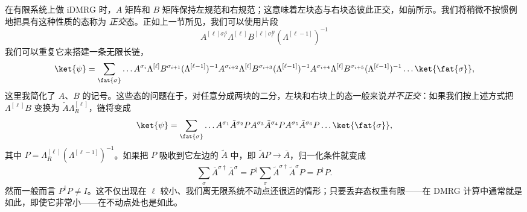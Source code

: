 在有限系统上做 iDMRG 时，$A$ 矩阵和 $B$ 矩阵保持左规范和右规范；这意味着左块态与右块态彼此正交，如前所示。我们将稍微不按惯例地把具有这种性质的态称为 {\em 正交}态。正如上一节所见，我们可以使用片段
\begin{equation}
A^{[\ell]\sigma_\ell^A}\Lambda^{[\ell]} B^{[\ell]\sigma_\ell^B} (\Lambda^{[\ell-1]})^{-1}
\end{equation}
我们可以重复它来搭建一条无限长链，
\begin{equation}
\ket{\psi} = \sum_{\fat{\sigma}} \ldots A^{\sigma_i}\Lambda^{[\ell]} B^{\sigma_{i+1}} (\Lambda^{[\ell-1]})^{-1}A^{\sigma_{i+2}}\Lambda^{[\ell]} B^{\sigma_{i+3}} (\Lambda^{[\ell-1]})^{-1}A^{\sigma_{i+4}}\Lambda^{[\ell]} B^{\sigma_{i+5}} (\Lambda^{[\ell-1]})^{-1} \ldots \ket{\fat{\sigma}} ,
\end{equation}
这里我简化了 $A$、$B$ 的记号。这些态的问题在于，对任意分成两块的二分，左块和右块上的态一般来说{\em 并不正交}：如果我们按上述方式把 $\Lambda^{[\ell]} B$ 变换为 $\tilde{A} \Lambda_R^{[\ell]}$，链将变成
\begin{equation}
\ket{\psi} = \sum_{\fat{\sigma}} \ldots A^{\sigma_1}\tilde{A}^{\sigma_{2}} P
A^{\sigma_{3}} \tilde{A}^{\sigma_{4}} P A^{\sigma_{5}}\tilde{A}^{\sigma_{6}} P \ldots \ket{\fat{\sigma}} ,
\end{equation}
其中 $P= \Lambda_R^{[\ell]} (\Lambda^{[\ell-1]})^{-1}$。如果把 $P$ 吸收到它左边的 $\tilde{A}$ 中，即 $\tilde{A}P \rightarrow \overline{A}$，归一化条件就变成
\begin{equation}
\sum_\sigma \overline{A}^{\sigma\dagger} \overline{A}^{\sigma} = P^\dagger \sum_\sigma \tilde{A}^{\sigma\dagger} \tilde{A}^\sigma P = P^\dagger P.
\end{equation}
然而一般而言 $P^\dagger P \neq I$。这不仅出现在 $\ell$ 较小、我们离无限系统不动点还很远的情形；只要丢弃态权重有限——在 DMRG 计算中通常就是如此，即使它非常小——在不动点处也是如此。

